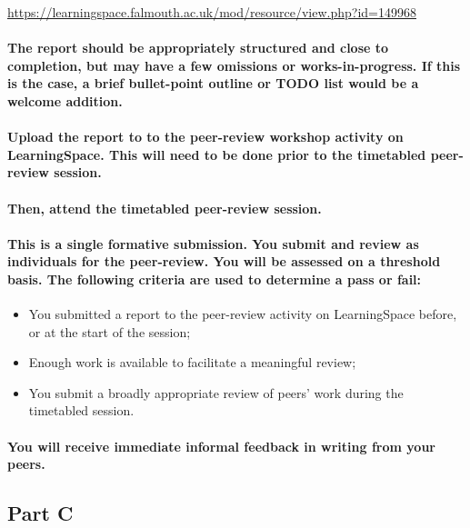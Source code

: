 \documentclass{../../fal_assignment}
\begin{document}
\url{https://learningspace.falmouth.ac.uk/mod/resource/view.php?id=149968}

\paragraph{The report should be appropriately structured and close to completion, but may have a few omissions or works-in-progress. If this is the case, a brief bullet-point outline or TODO list would be a welcome addition. }

\paragraph{Upload the report to to the peer-review workshop activity on LearningSpace. This will need to be done prior to the timetabled peer-review session.}

\paragraph{Then, attend the timetabled peer-review session.}

\paragraph{This is a \textbf{single formative submission}. You submit and review as \textbf{individuals} for the peer-review. You will be assessed on a \textbf{threshold} basis. The following criteria are used to determine a pass or fail:}

\begin{itemize}
	\item You submitted a report to the peer-review activity on LearningSpace before, or at the start of the session;
	\item Enough work is available to facilitate a meaningful review;
	\item You submit a broadly appropriate review of peers' work during the timetabled session.
\end{itemize}

\paragraph{You will receive immediate \textbf{informal feedback} in writing from your \textbf{peers}.}

\subsection*{Part C}
\end{document}
